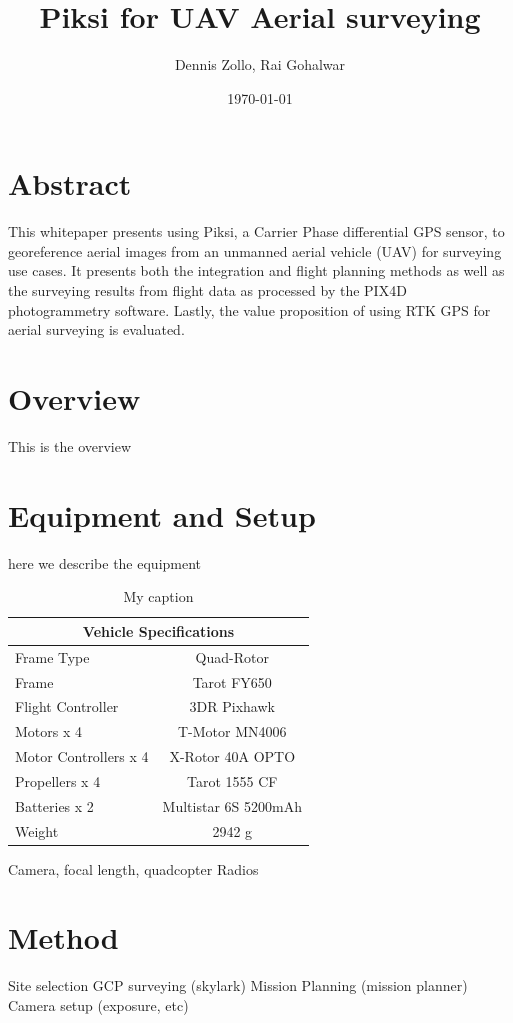 \documentclass{article}
\title{Piksi for UAV Aerial surveying}
\author{Dennis Zollo, Rai Gohalwar}
\date{\today}
\begin{document}
\maketitle

\thispagestyle{firstpage}

\section{Abstract}
\label{sec:abstract}
This whitepaper presents using Piksi, a Carrier Phase differential GPS sensor, to georeference aerial images from an unmanned aerial vehicle (UAV) for surveying use cases.
It presents both the integration and flight planning methods as well as the surveying  results from flight data as processed by the PIX4D photogrammetry software.
Lastly, the value proposition of using RTK GPS for aerial surveying is evaluated.
\tableofcontents
\newpage
\section{Overview}
\label{sec:Overview}
This is the overview
\section{Equipment and Setup}
\label{sec:equipment}
here we describe the equipment
\begin{table}[]
\centering
\caption{My caption}
\label{my-label}
\begin{tabular}{|l|c|}
\hline
\multicolumn{2}{|c|}{Vehicle Specifications} \\ \hline
Frame Type            & Quad-Rotor           \\ \hline
Frame                 & Tarot FY650          \\ \hline
Flight Controller     & 3DR Pixhawk          \\ \hline
Motors x 4            & T-Motor MN4006       \\ \hline
Motor Controllers x 4 & X-Rotor 40A OPTO     \\ \hline
Propellers x 4        & Tarot 1555 CF        \\ \hline
Batteries x 2         & Multistar 6S 5200mAh \\ \hline
Weight                & 2942 g               \\ \hline
\end{tabular}
\end{table}
Camera, focal length, quadcopter
Radios
\section{Method}
\label{sec:method}
Site selection
GCP surveying (skylark)
Mission Planning (mission planner)
Camera setup (exposure, etc)
\end{document}
